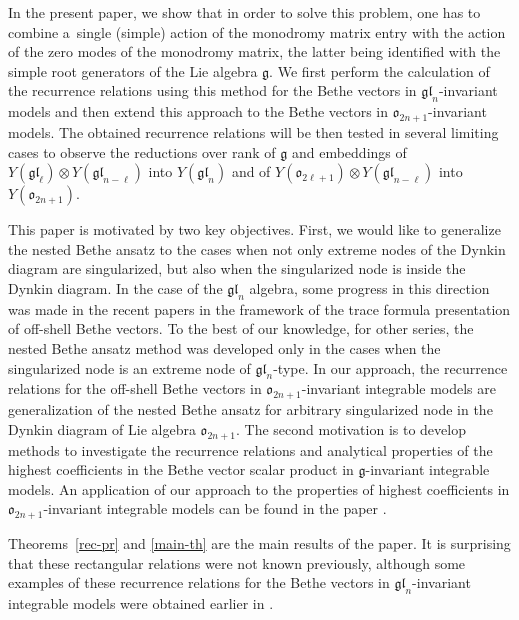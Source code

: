\documentclass[pdftex]{sigma}
\theoremstyle{definition}
\begin{document}
In the present paper, we show that in order to solve this problem, one has to combine a~single
(simple) action of the monodromy matrix entry with the action of the zero modes of the
monodromy matrix, the latter being identified with the simple root generators of the Lie algebra
$\mathfrak{g}$. We first perform the calculation of the recurrence relations
using this method for the Bethe vectors in $\mathfrak{gl}_n$-invariant models
and then extend this approach to the Bethe vectors in
$\mathfrak{o}_{2n+1}$-invariant models. The obtained recurrence relations will
be then tested in several limiting cases to observe the reductions over rank of
$\mathfrak{g}$ and embeddings of $Y(\mathfrak{gl}_{\ell})\otimes
Y(\mathfrak{gl}_{n-\ell})$ into $Y(\mathfrak{gl}_{n})$ and
 of $Y(\mathfrak{o}_{2\ell+1})\otimes Y(\mathfrak{gl}_{n-\ell})$
into $Y(\mathfrak{o}_{2n+1})$.


This paper is motivated by two key objectives. First, we would like to
generalize the nested Bethe ansatz to the cases when not only extreme nodes
of the Dynkin diagram are singularized, but also when the singularized node is inside the
Dynkin diagram. In the case of the $\mathfrak{gl}_n$ algebra, some progress in this direction was made in the recent papers \cite{KT1,KT2} in the framework of the trace formula presentation of off-shell Bethe vectors. To the best of our knowledge,
for other series, the nested Bethe ansatz method was developed
 only in the cases when the singularized node is an extreme node of $\mathfrak{gl}_n$-type.
 In our approach, the recurrence relations for the off-shell Bethe vectors in
 $\mathfrak{o}_{2n+1}$-invariant integrable models are generalization of the
 nested Bethe ansatz for arbitrary singularized node in the Dynkin diagram
 of Lie algebra $\mathfrak{o}_{2n+1}$. The second motivation is to develop
 methods to investigate the recurrence relations and analytical properties
 of the highest coefficients in the Bethe vector scalar product in
 $\mathfrak{g}$-invariant integrable models. An application of our approach
 to the properties of highest coefficients in $\mathfrak{o}_{2n+1}$-invariant
 integrable models can be found in the paper \cite{LPR25}.


Theorems~\ref{rec-pr} and \ref{main-th} are the main results of the paper.
It is surprising that these rectangular relations were not known previously,
although some examples of these recurrence relations for the Bethe
vectors in $\mathfrak{gl}_n$-invariant integrable models were obtained earlier
in \cite{G23,HLPRS-SP17}.
\end{document}

